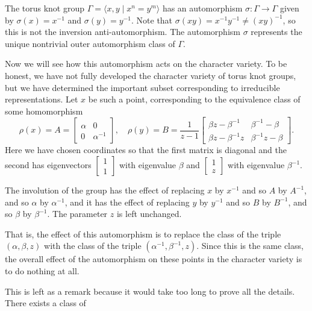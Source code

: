 \documentclass[11pt, oneside, usenames, dvipsnames, svgnames, table, final]{amsart}
\begin{document}
\begin{example}
  The torus knot group $\Gamma = \langle x,y \mid x^n = y^m \rangle$ has an automorphism $\sigma: \Gamma \to \Gamma$ given
  by $\sigma(x) =x^{-1}$ and $\sigma(y) = y^{-1}$. Note that $\sigma(xy)= x^{-1}y^{-1} \neq (xy)^{-1}$, so this is not
  the inversion anti-automorphism. The automorphism $\sigma$ represents the unique nontrivial outer automorphism class of
  $\Gamma$.


  Now we will see how this automorphism acts on the character variety. To be honest, we have not fully developed the
  character variety of torus knot groups, but we have determined the important subset corresponding to irreducible
  representations. Let $x$ be such a point, corresponding to the equivalence class of some homomorphism
  \[  \rho(x) = A = \begin{bmatrix} \alpha & 0 \\ 0 & \alpha^{-1} \end{bmatrix}, \quad \rho(y) = B =
    \frac{1}{z-1}\begin{bmatrix} \beta z - \beta^{-1} & \beta^{-1} - \beta \\ \beta z - \beta^{-1} z & \beta^{-1} z -
      \beta \end{bmatrix}. \]
  Here we have chosen coordinates so that the first matrix is diagonal and the second has eigenvectors $\begin{bmatrix}
    1 \\ 1 \end{bmatrix}$ with eigenvalue $\beta$ and $\begin{bmatrix} 1 \\ z \end{bmatrix}$ with eigenvalue
  $\beta^{-1}$.

  The involution of the group has the effect of replacing $x$ by $x^{-1}$ and so $A$ by $A^{-1}$, and so $\alpha$ by
  $\alpha^{-1}$, and it has the effect of replacing $y$ by $y^{-1}$ and so $B$ by $B^{-1}$, and so $\beta$ by
  $\beta^{-1}$. The parameter $z$ is left unchanged.

  That is, the effect of this automorphism is to replace the class of the triple $(\alpha, \beta, z)$ with the class of
  the triple $(\alpha^{-1}, \beta^{-1}, z)$. Since this is the same class, the overall effect of the automorphism on
  these points in the character variety is to do nothing at all.  
\end{example}

\begin{remark}
    This is left as a remark because it would take too long to prove all the details. There exists a class of 
\end{remark}
\end{document}

